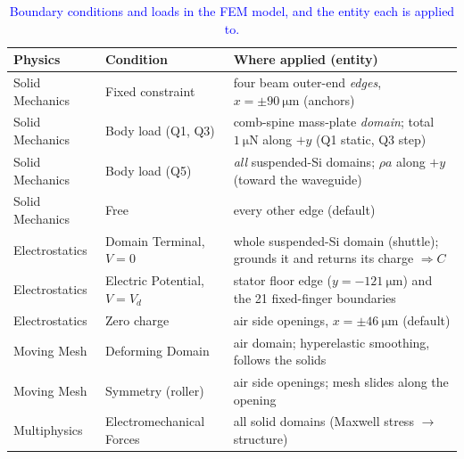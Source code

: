 \documentclass[11pt,a4paper]{article}
\newcommand{\Vd}{V_{d}}
\begin{document}
\begin{table}[H]
\centering
\small
\caption{\textcolor{blue}{Boundary conditions and loads in the FEM model, and
the entity each is applied to.}}
\label{tab:bc}
\begin{tabularx}{\textwidth}{@{}l l X@{}}
\toprule
\textbf{Physics} & \textbf{Condition} & \textbf{Where applied (entity)}\\
\midrule
Solid Mechanics & Fixed constraint            & four beam outer-end \emph{edges}, $x=\pm90~\si{\micro\meter}$ (anchors)\\
Solid Mechanics & Body load (Q1, Q3)          & comb-spine mass-plate \emph{domain}; total $\SI{1}{\micro\newton}$ along $+y$ (Q1 static, Q3 step)\\
Solid Mechanics & Body load (Q5)              & \emph{all} suspended-Si domains; $\rho a$ along $+y$ (toward the waveguide)\\
Solid Mechanics & Free                        & every other edge (default)\\
Electrostatics  & Domain Terminal, $V=0$      & whole suspended-Si domain (shuttle); grounds it and returns its charge $\Rightarrow C$\\
Electrostatics  & Electric Potential, $V=\Vd$ & stator floor edge ($y=-121~\si{\micro\meter}$) and the 21 fixed-finger boundaries\\
Electrostatics  & Zero charge                 & air side openings, $x=\pm46~\si{\micro\meter}$ (default)\\
Moving Mesh     & Deforming Domain            & air domain; hyperelastic smoothing, follows the solids\\
Moving Mesh     & Symmetry (roller)           & air side openings; mesh slides along the opening\\
Multiphysics    & Electromechanical Forces    & all solid domains (Maxwell stress $\rightarrow$ structure)\\
\bottomrule
\end{tabularx}
\end{table}




\end{document}
